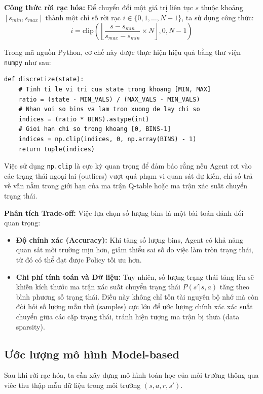 \textbf{Công thức rời rạc hóa:}
Để chuyển đổi một giá trị liên tục $s$ thuộc khoảng $[s_{min}, s_{max}]$ thành một chỉ số rời rạc $i \in \{0, 1, \dots, N-1\}$, ta sử dụng công thức:
\begin{equation}
    i = \text{clip} \left( \left\lfloor \frac{s - s_{min}}{s_{max} - s_{min}} \times N \right\rfloor, 0, N-1 \right)
\end{equation}

Trong mã nguồn Python, cơ chế này được thực hiện hiệu quả bằng thư viện \texttt{numpy} như sau:
\begin{lstlisting}[style=PythonStyle]
def discretize(state):
    # Tinh ti le vi tri cua state trong khoang [MIN, MAX]
    ratio = (state - MIN_VALS) / (MAX_VALS - MIN_VALS)
    # Nhan voi so bins va lam tron xuong de lay chi so
    indices = (ratio * BINS).astype(int)
    # Gioi han chi so trong khoang [0, BINS-1]
    indices = np.clip(indices, 0, np.array(BINS) - 1)
    return tuple(indices)
\end{lstlisting}
Việc sử dụng \texttt{np.clip} là cực kỳ quan trọng để đảm bảo rằng nếu Agent rơi vào các trạng thái ngoại lai (outliers) vượt quá phạm vi quan sát dự kiến, chỉ số trả về vẫn nằm trong giới hạn của ma trận Q-table hoặc ma trận xác suất chuyển trạng thái.

\textbf{Phân tích Trade-off:}
Việc lựa chọn số lượng bins là một bài toán đánh đổi quan trọng:
\begin{itemize}
    \item \textbf{Độ chính xác (Accuracy):} Khi tăng số lượng bins, Agent có khả năng quan sát môi trường mịn hơn, giảm thiểu sai số do việc làm tròn trạng thái, từ đó có thể đạt được Policy tối ưu hơn.
    \item \textbf{Chi phí tính toán và Dữ liệu:} Tuy nhiên, số lượng trạng thái tăng lên sẽ khiến kích thước ma trận xác suất chuyển trạng thái $P(s'|s, a)$ tăng theo bình phương số trạng thái. Điều này không chỉ tốn tài nguyên bộ nhớ mà còn đòi hỏi số lượng mẫu thử (samples) cực lớn để ước lượng chính xác xác suất chuyển giữa các cặp trạng thái, tránh hiện tượng ma trận bị thưa (data sparsity).
\end{itemize}

\subsection{Ước lượng mô hình Model-based}
Sau khi rời rạc hóa, ta cần xây dựng mô hình toán học của môi trường thông qua viêc thu thập mẫu dữ liệu trong môi trường $(s, a, r, s')$.


